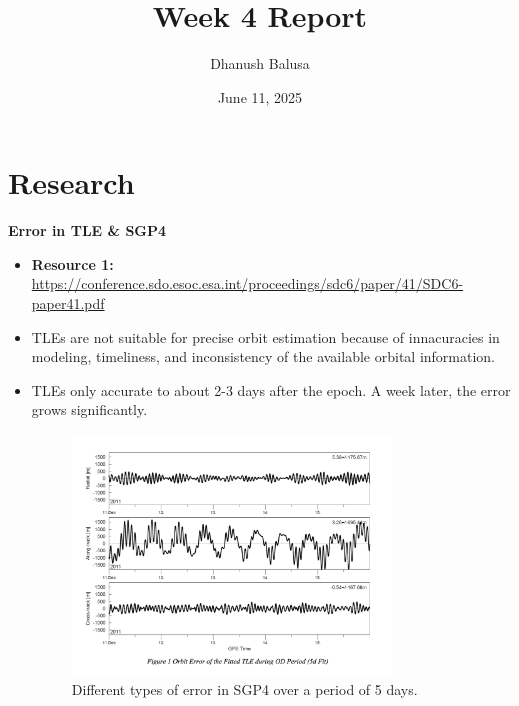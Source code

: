 \documentclass[12pt]{report}
\title{Week 4 Report}
\author{Dhanush Balusa}
\date{June 11, 2025}
\begin{document}
\maketitle

\chapter*{Research}

\textbf{Error in TLE \& SGP4}
\begin{itemize}
  \item \textbf{Resource 1:} \url{https://conference.sdo.esoc.esa.int/proceedings/sdc6/paper/41/SDC6-paper41.pdf}
        \item TLEs are not suitable for precise orbit estimation because of innacuracies in modeling, timeliness, and inconsistency of the available orbital information.
        \item TLEs only accurate to about 2-3 days after the epoch. A week later, the error grows significantly.
        \begin{figure}[H]
          \centering
          \includegraphics[width=0.8\textwidth]{figure_week_4_SGP4-error.png}
          \caption{Different types of error in SGP4 over a period of 5 days.}
          \label{fig:SPG4_error}
        \end{figure}


\end{itemize}
\end{document}

